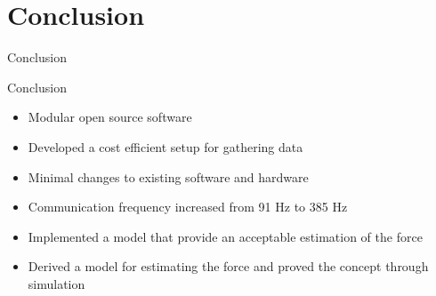 \section{Conclusion}

\begin{frame}{Conclusion}{}


\end{frame}

\begin{frame}{Conclusion}{}

  \begin{itemize}
    \item Modular open source software
    \item Developed a cost efficient setup for gathering data
    \item Minimal changes to existing software and hardware
    \item Communication frequency increased from 91 Hz to 385 Hz
    \item Implemented a model that provide an acceptable estimation of the force
    \item Derived a model for estimating the force and proved the concept through simulation
  \end{itemize}

\end{frame}



